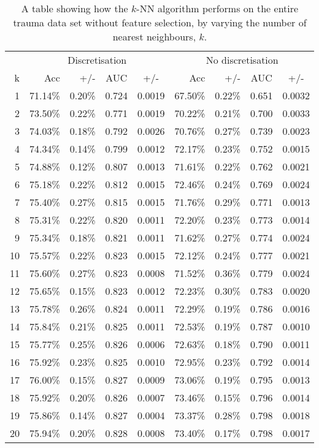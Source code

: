 \begin{table}[htbp]
\caption{A table showing how the $k$-NN algorithm performs on the entire trauma data set without feature selection, by varying the number of nearest neighbours, $k$.}
\begin{tabular}{|r|rrrr|rrrr|}
\hline
\multicolumn{1}{|l|}{} & \multicolumn{ 4}{c|}{Discretisation} & \multicolumn{ 4}{c|}{No discretisation} \\
k & Acc & +/- & \multicolumn{1}{c}{AUC} & \multicolumn{1}{c|}{+/-} & Acc & +/- & \multicolumn{1}{c}{AUC} & \multicolumn{1}{c|}{+/-} \\ \hline
1 & 71.14\% & 0.20\% & 0.724 & 0.0019 & 67.50\% & 0.22\% & 0.651 & 0.0032 \\
2 & 73.50\% & 0.22\% & 0.771 & 0.0019 & 70.22\% & 0.21\% & 0.700 & 0.0033 \\
3 & 74.03\% & 0.18\% & 0.792 & 0.0026 & 70.76\% & 0.27\% & 0.739 & 0.0023 \\
4 & 74.34\% & 0.14\% & 0.799 & 0.0012 & 72.17\% & 0.23\% & 0.752 & 0.0015 \\
5 & 74.88\% & 0.12\% & 0.807 & 0.0013 & 71.61\% & 0.22\% & 0.762 & 0.0021 \\
6 & 75.18\% & 0.22\% & 0.812 & 0.0015 & 72.46\% & 0.24\% & 0.769 & 0.0024 \\
7 & 75.40\% & 0.27\% & 0.815 & 0.0015 & 71.76\% & 0.29\% & 0.771 & 0.0013 \\
8 & 75.31\% & 0.22\% & 0.820 & 0.0011 & 72.20\% & 0.23\% & 0.773 & 0.0014 \\
9 & 75.34\% & 0.18\% & 0.821 & 0.0011 & 71.62\% & 0.27\% & 0.774 & 0.0024 \\
10 & 75.57\% & 0.22\% & 0.823 & 0.0015 & 72.12\% & 0.24\% & 0.777 & 0.0021 \\
11 & 75.60\% & 0.27\% & 0.823 & 0.0008 & 71.52\% & 0.36\% & 0.779 & 0.0024 \\
12 & 75.65\% & 0.15\% & 0.823 & 0.0012 & 72.23\% & 0.30\% & 0.783 & 0.0020 \\
13 & 75.78\% & 0.26\% & 0.824 & 0.0011 & 72.29\% & 0.19\% & 0.786 & 0.0016 \\
14 & 75.84\% & 0.21\% & 0.825 & 0.0011 & 72.53\% & 0.19\% & 0.787 & 0.0010 \\
15 & 75.77\% & 0.25\% & 0.826 & 0.0006 & 72.63\% & 0.18\% & 0.790 & 0.0011 \\
16 & 75.92\% & 0.23\% & 0.825 & 0.0010 & 72.95\% & 0.23\% & 0.792 & 0.0014 \\
17 & 76.00\% & 0.15\% & 0.827 & 0.0009 & 73.06\% & 0.19\% & 0.795 & 0.0013 \\
18 & 75.92\% & 0.20\% & 0.826 & 0.0007 & 73.46\% & 0.15\% & 0.796 & 0.0014 \\
19 & 75.86\% & 0.14\% & 0.827 & 0.0004 & 73.37\% & 0.28\% & 0.798 & 0.0018 \\
20 & 75.94\% & 0.20\% & 0.828 & 0.0008 & 73.40\% & 0.17\% & 0.798 & 0.0017 \\ \hline
\end{tabular}
\end{table}
